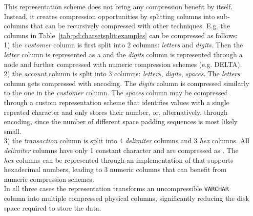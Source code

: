 This representation scheme does not bring any compression benefit by itself. Instead, it creates compression opportunities by splitting columns into sub-columns that can be recursively compressed with other techniques. E.g. the columns in Table~\ref{tab:pd:charsetsplit:examples} can be compressed as follows:\\
1) the \textit{customer} column is first split into 2 columns: \textit{letters} and \textit{digits}. Then the \textit{letter} column is represented as a  and the \textit{digits} column is represented through a  node and further compressed with numeric compression schemes (e.g. DELTA).\\
2) the \textit{account} column is split into 3 columns: \textit{letters}, \textit{digits}, \textit{spaces}. The \textit{letters} column gets compressed with  encoding. The \textit{digits} column is compressed similarly to the one in the \textit{customer} column. The \textit{spaces} column may be compressed through a custom representation scheme that identifies values with a single repeated character and only stores their number, or, alternatively, through  encoding, since the number of different space padding sequences is most likely small.\\
3) the \textit{transaction} column is split into 4 \textit{delimiter} columns and 3 \textit{hex} columns. All \textit{delimiter} columns have only 1 constant character and are compressed as . The \textit{hex} columns can be represented through an implementation of  that supports hexadecimal numbers, leading to 3 numeric columns that can benefit from numeric compression schemes.\\
In all three cases the  representation transforms an uncompressible \verb|VARCHAR| column into multiple compressed physical columns, significantly reducing the disk space required to store the data.

